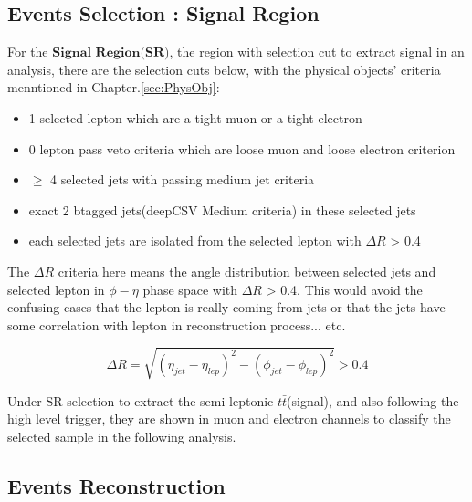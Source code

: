 
	\subsection{Events Selection : Signal Region}
	\label{ssec:EvtSel_SR}

		For the $\textbf{Signal Region(SR)}$, the region with selection cut to extract signal in an analysis, there are the selection cuts below, with the physical objects' criteria menntioned in Chapter.\ref{sec:PhysObj}:

		\begin{itemize}
	  		\item 1 selected lepton which are a tight muon or a tight electron
	  		\item 0 lepton pass veto criteria which are loose muon and loose electron criterion
	  		\item $\geq$ 4 selected jets with passing medium jet criteria
	  		\item exact 2 btagged jets(deepCSV Medium criteria) in these selected jets
	  		\item each selected jets are isolated from the selected lepton with $\Delta R$ > 0.4
	  	\label{EventSelReco:itm:full_sel}
		\end{itemize}

		The $\Delta R$ criteria here means the angle distribution between selected jets and selected lepton in $\phi - \eta$ phase space with $\Delta R$ > 0.4. This would avoid the confusing cases that the lepton is really coming from jets or that the jets have some correlation with lepton in reconstruction process... etc.

		\begin{equation}
		\Delta R = \sqrt{ (\eta_{jet} - \eta_{lep})^2 - (\phi_{jet} - \phi_{lep})^2 } > 0.4
		\end{equation}

		Under SR selection to extract the semi-leptonic $t\bar{t}$(signal), and also following the high level trigger, they are shown in muon and electron channels to classify the selected sample in the following analysis.



	\subsection{Events Reconstruction}
	\label{ssec:EvtReco}

